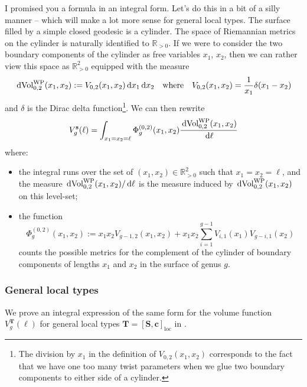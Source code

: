 \documentclass[12pt,twoside]{article}
\theoremstyle{theorem}
\theoremstyle{remark}
\theoremstyle{definition}
\theoremstyle{example}
\newcommand{\R}{\mathbb{R}}
\renewcommand{\d}{\, \mathrm{d}}
\newcommand{\1}[1]{\mathds{1}_{#1}}
\newcommand{\Sf}{\mathbf{S}}
\newcommand{\eqc}[1]{[ #1 ]_{\mathrm{loc}}}
\newcommand{\Volwp}[1][g]{\mathrm{Vol}_{#1}^{\mathrm{\scriptsize{WP}}}}
\newcommand{\curve}{\mathbf{c}}
\newcommand{\type}{\mathbf{T}}
\begin{document}
I promised you a formula in an integral form. Let's do this in a bit of a silly manner -- which will
make a lot more sense for general local types.
The surface filled by a simple closed geodesic is a cylinder. The space of Riemannian metrics on the
cylinder is naturally identified to $\R_{>0}$. If we were to consider the two boundary components of
the cylinder as free variables $x_1$, $x_2$, then we can rather view this space as $\R_{>0}^2$
equipped with the measure 
\begin{equation*}
  \d \Volwp[0,2](x_1,x_2) := V_{0,2}(x_1,x_2) \d x_1 \d x_2
  \quad \text{where} \quad
  V_{0,2}(x_1,x_2) = \frac{1}{x_1} \delta(x_1-x_2)
\end{equation*}
and $\delta$ is the Dirac delta function\footnote{The division by $x_1$ in the definition of
  $V_{0,2}(x_1,x_2)$ corresponds to the fact that we have one too many twist parameters when we glue
  two boundary components to either side of a cylinder.}. We can then rewrite
\begin{equation}
  \label{eq:Vsimpleint}
  V_g^{\mathbf{s}}(\ell)
  = \int_{\substack{x_1=x_2=\ell}}
  \Phi_{g}^{(0,2)}(x_1,x_2) \frac{\d \Volwp[0,2](x_1,x_2)}{\d \ell}
\end{equation}
where:
\begin{itemize}
\item the integral runs over the set of $(x_1, x_2) \in \R_{>0}^2$ such that $x_1=x_2=\ell$,
and the measure $\d \Volwp[0,2](x_1,x_2)/\d \ell$ is the measure induced by $\d
  \Volwp[0,2](x_1,x_2)$ on this level-set;
\item the function
  \begin{equation}
    \label{eq:psisimple}
    \Phi_{g}^{(0,2)}(x_1,x_2) 
    := x_1 x_2 V_{g-1,2}(x_1,x_2) + x_1 x_2\sum_{i=1}^{g-1} V_{i,1}(x_1) V_{g-i,1}(x_2)
  \end{equation}
  counts the possible metrics for the complement of the cylinder of boundary components of lengths
  $x_1$ and $x_2$ in the surface of genus $g$.
\end{itemize}

\subsubsection{General local types}
\label{sec:general-local-types}

We prove an integral expression of the same form for the volume function $V_g^\type(\ell)$ for
general local types $\type = \eqc{\Sf,\curve}$ in \cite[\S 5]{anantharaman2023}.
\end{document}
